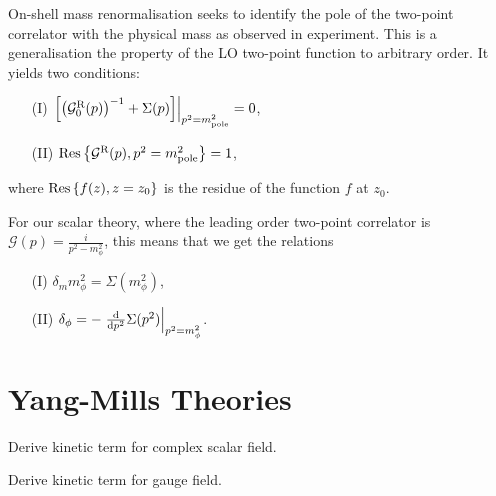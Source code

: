\documentclass[../main.tex]{subfiles}
\begin{document}
On-shell mass renormalisation seeks to identify the pole of the two-point
correlator with the physical mass as observed in experiment. This is a
generalisation the property of the LO two-point function to arbitrary order. It
yields two conditions:
\begin{center}
    \begin{itemize}
        \item [(I)] \(\evalat{\bclosed{\pclosed{\mathcal{G}^\text{R}_0(p)}^{-1} + \Sigma(p)}}{p^2 = m_\text{pole}^2} = 0\),
        \item [(II)] \(\operatorname{Res}\cclosed{\mathcal{G}^\text{R}(p), p^2 = m_\text{pole}^2} = 1\),
    \end{itemize}
\end{center}
where \(\operatorname{Res}\cclosed{f(z), z = z_0}\) is the residue of the function \(f\) at \(z_0\).
\medskip

For our scalar theory, where the leading order two-point correlator is
\(\mathcal{G}(p) = \frac{i}{p^2 - m_\phi^2}\), this means that we get the
relations
\begin{center}
    \begin{itemize}
        \item [(I)] \(\delta_m m_\phi^2 = \Sigma(m_\phi^2)\),
        \item [(II)] \(\delta_\phi = -\evalat{\d[p^2]{}\Sigma(p^2)}{p^2 = m_\phi^2}\).
    \end{itemize}
\end{center}
\provethis{}



\section{Yang-Mills Theories}
\begin{TODO}
    \item [\checked] Derive kinetic term for complex scalar field.
    \item Derive kinetic term for gauge field.
\end{TODO}
\end{document}
